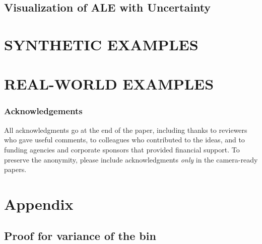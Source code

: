 \documentclass[twoside]{article}
\begin{document}


\subsection{Visualization of ALE with Uncertainty}

\section{SYNTHETIC EXAMPLES}

\section{REAL-WORLD EXAMPLES}


\subsubsection*{Acknowledgements}
All acknowledgments go at the end of the paper, including thanks to reviewers who gave useful comments, to colleagues who contributed to the ideas, and to funding agencies and corporate sponsors that provided financial support. 
To preserve the anonymity, please include acknowledgments \emph{only} in the camera-ready papers.




\section*{Appendix}

\subsection{Proof for variance of the bin}
\end{document}
